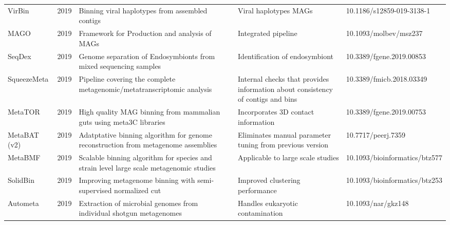 \begin{tabular}{p{2cm}|p{0.6cm}|p{4cm}|p{4cm}|p{3.4cm}}
                 VirBin \cite{Chen2019virbin} &  2019 &                                           Binning viral haplotypes from assembled contigs &                                                           Viral haplotypes MAGs &      10.1186/s12859-019-3138-1 \\
                  MAGO \cite{murovec2019mago} &  2019 &                                             Framework for Production and analysis of MAGs &                                                             Integrated pipeline &          10.1093/molbev/msz237 \\
             SeqDex \cite{chiodi2019seqdechi} &  2019 &                          Genome separation of Endosymbionts from mixed sequencing samples &                                                  Identification of endosymbiont &       10.3389/fgene.2019.00853 \\
    SqueezeMeta \cite{tamames2019squeezemeta} &  2019 &                    Pipeline covering the complete metagenomic/metatranscriptomic analysis & Internal checks that provides information about consistency of contigs and bins &       10.3389/fmicb.2018.03349 \\
             MetaTOR \cite{Baudry2019Metator} &  2019 &                       High quality MAG binning from mammalian guts using meta3C libraries &                                             Incorporates 3D contact information &       10.3389/fgene.2019.00753 \\
         MetaBAT (v2) \cite{Kang2019metabat2} &  2019 &        Adatptative binning algorithm for genome reconstruction from metagenome assemblies &                        Eliminates manual parameter tuning from previous version &             10.7717/peerj.7359 \\
                 MetaBMF \cite{Ma2019MetaBMF} &  2019 &   Scalable binning algorithm for species and strain level large scale metagenomic studies &                                               Applicable to large scale studies &  10.1093/bioinformatics/btz577 \\
             SolidBin \cite{wang2019SolidBin} &  2019 &                          Improving metagenome binning with semi-supervised normalized cut &                                                 Improved clustering performance &  10.1093/bioinformatics/btz253 \\
           Autometa \cite{miller2019autometa} &  2019 &                       Extraction of microbial genomes from individual shotgun metagenomes &                                                Handles eukaryotic contamination &             10.1093/nar/gkz148 \\

\end{tabular}
